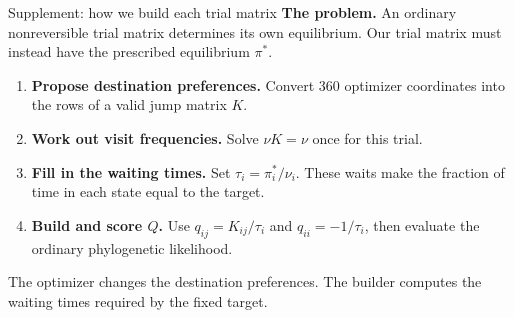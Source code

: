 \documentclass[aspectratio=169,11pt]{beamer}
\newcommand{\pis}{\pi^{\ast}}
\begin{document}
\begingroup
{}
\begin{frame}{Supplement: how we build each trial matrix}
\textbf{The problem.} An ordinary nonreversible trial matrix determines its own equilibrium.
Our trial matrix must instead have the prescribed equilibrium $\pis$.

\vspace{1mm}
\begin{enumerate}
\item \textbf{Propose destination preferences.} Convert 360 optimizer coordinates into the rows of a valid jump matrix $K$.
\item \textbf{Work out visit frequencies.} Solve $\nu K=\nu$ once for this trial.
\item \textbf{Fill in the waiting times.} Set $\tau_i=\pi_i^\ast/\nu_i$.
These waits make the fraction of time in each state equal to the target.
\item \textbf{Build and score $Q$.} Use $q_{ij}=K_{ij}/\tau_i$ and $q_{ii}=-1/\tau_i$, then evaluate the ordinary phylogenetic likelihood.
\end{enumerate}
\vspace{1mm}
\alert{The optimizer changes the destination preferences. The builder computes
the waiting times required by the fixed target.}


\end{frame}
\endgroup
\end{document}
